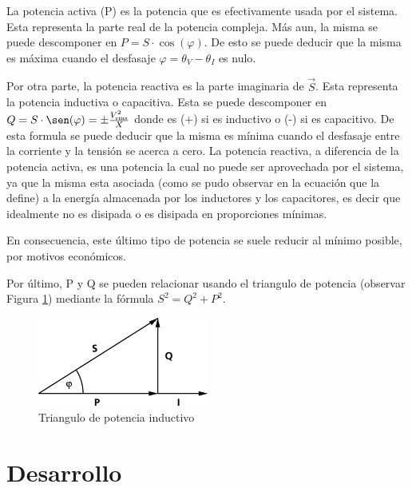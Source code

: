 \documentclass{article}
\begin{document}
        La potencia activa (P) es la potencia que es efectivamente usada por el sistema. Esta representa la parte real de la potencia compleja.
        Más aun, la misma se puede descomponer en $P= S \cdot \cos (\varphi)$. De esto se puede deducir que la misma es máxima cuando el desfasaje $\varphi = \theta_{V} - \theta_I $ es nulo. \par

        Por otra parte, la potencia reactiva es la parte imaginaria de $\vec{S}$. Esta representa la potencia inductiva o capacitiva. Esta se puede descomponer en $ Q = S \cdot \sen (\varphi)= \pm \frac{V_\text{rms}^2}{X}$ donde es (+) si es inductivo o (-) si es capacitivo.
        De esta formula se puede deducir que la misma es mínima cuando el desfasaje entre la corriente y la tensión se acerca a cero. La potencia reactiva, a diferencia de la potencia activa, es una potencia la cual no puede ser aprovechada por el sistema, 
        ya que la misma esta asociada (como se pudo observar en la ecuación que la define) a la energía almacenada por los inductores y los capacitores, es decir que idealmente no es disipada o es disipada en proporciones mínimas. \par

        En consecuencia, este último tipo de potencia se suele reducir al mínimo posible, por motivos económicos.

        Por último, P y Q se pueden relacionar usando el triangulo de potencia (observar Figura \ref{fig:triangulo_de_potencia}) mediante la fórmula $S^2=Q^2+P^2$. 
        \begin{figure}[h!] %
            \centering
            \includegraphics[width=0.5\textwidth]{Trojkat-mocy.png} %
            \caption{Triangulo de potencia inductivo}
            \label{fig:triangulo_de_potencia} %
        \end{figure}

    \indent
    \section{Desarrollo}
\end{document}
